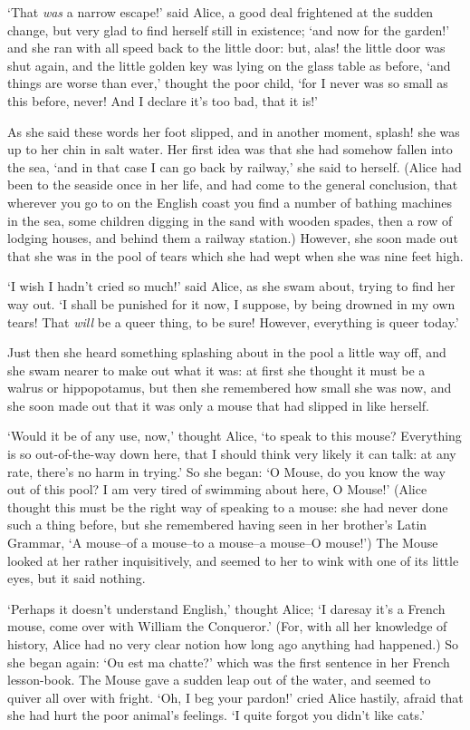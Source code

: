 `That {\it was} a narrow escape!' said Alice, a good deal frightened at
the sudden change, but very glad to find herself still in
existence; `and now for the garden!' and she ran with all speed
back to the little door:  but, alas! the little door was shut
again, and the little golden key was lying on the glass table as
before, `and things are worse than ever,' thought the poor child,
`for I never was so small as this before, never!  And I declare
it's too bad, that it is!'

  As she said these words her foot slipped, and in another
moment, splash! she was up to her chin in salt water.  Her first
idea was that she had somehow fallen into the sea, `and in that
case I can go back by railway,' she said to herself.  (Alice had
been to the seaside once in her life, and had come to the general
conclusion, that wherever you go to on the English coast you find
a number of bathing machines in the sea, some children digging in
the sand with wooden spades, then a row of lodging houses, and
behind them a railway station.)  However, she soon made out that
she was in the pool of tears which she had wept when she was nine
feet high.

  `I wish I hadn't cried so much!' said Alice, as she swam about,
trying to find her way out.  `I shall be punished for it now, I
suppose, by being drowned in my own tears!  That {\it will} be a queer
thing, to be sure!  However, everything is queer today.'

  Just then she heard something splashing about in the pool a
little way off, and she swam nearer to make out what it was:  at
first she thought it must be a walrus or hippopotamus, but then
she remembered how small she was now, and she soon made out that
it was only a mouse that had slipped in like herself.

  `Would it be of any use, now,' thought Alice, `to speak to this
mouse?  Everything is so out-of-the-way down here, that I should
think very likely it can talk:  at any rate, there's no harm in
trying.'  So she began:  `O Mouse, do you know the way out of
this pool?  I am very tired of swimming about here, O Mouse!'
(Alice thought this must be the right way of speaking to a mouse:
she had never done such a thing before, but she remembered having
seen in her brother's Latin Grammar, `A mouse--of a mouse--to a
mouse--a mouse--O mouse!')  The Mouse looked at her rather
inquisitively, and seemed to her to wink with one of its little
eyes, but it said nothing.

  `Perhaps it doesn't understand English,' thought Alice; `I
daresay it's a French mouse, come over with William the
Conqueror.'  (For, with all her knowledge of history, Alice had
no very clear notion how long ago anything had happened.)  So she
began again:  `Ou est ma chatte?' which was the first sentence in
her French lesson-book.  The Mouse gave a sudden leap out of the
water, and seemed to quiver all over with fright.  `Oh, I beg
your pardon!' cried Alice hastily, afraid that she had hurt the
poor animal's feelings.  `I quite forgot you didn't like cats.'

